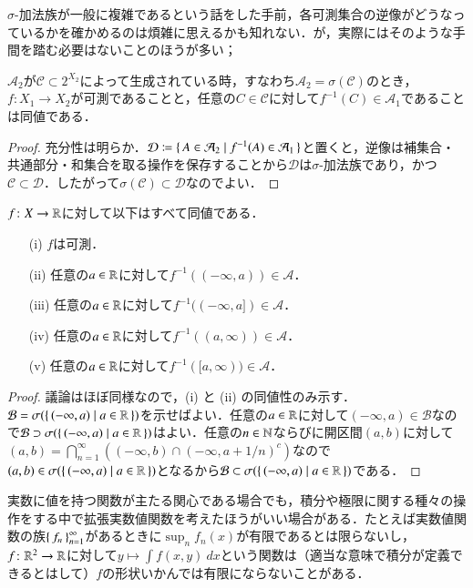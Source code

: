 $\sigma$-加法族が一般に複雑であるという話をした手前，各可測集合の逆像がどうなっているかを確かめるのは煩雑に思えるかも知れない．が，実際にはそのような手間を踏む必要はないことのほうが多い；

\begin{lem}
$\mathcal{A}_2$が$\mathcal{C} \subset 2^{X_2}$によって生成されている時，すなわち$\mathcal{A}_2 = \sigma(\mathcal{C})$のとき，$f \colon X_1 \to X_2$が可測であることと，任意の$C \in \mathcal{C}$に対して$f^{-1}(C) \in \mathcal{A}_1$であることは同値である．
\end{lem}

\begin{proof}
充分性は明らか．$\mathcal{D} \coloneqq \set{ A \in \mathcal{A}_2 | f^{-1}(A) \in \mathcal{A}_1}$と置くと，逆像は補集合・共通部分・和集合を取る操作を保存することから$\mathcal{D}$は$\sigma$-加法族であり，かつ$\mathcal{C} \subset \mathcal{D}$．したがって$\sigma(\mathcal{C}) \subset \mathcal{D}$なのでよい．
\end{proof}

\begin{lem}
$f \colon X \to \mathbb{R}$に対して以下はすべて同値である．
\begin{enumerate}
\item[(i)] $f$は可測．
\item[(ii)] 任意の$a \in \mathbb{R}$に対して$f^{-1}((-\infty,a)) \in \mathcal{A}$．
\item[(iii)] 任意の$a \in \mathbb{R}$に対して$f^{-1}((-\infty,a]) \in \mathcal{A}$．
\item[(iv)] 任意の$a \in \mathbb{R}$に対して$f^{-1}((a,\infty)) \in \mathcal{A}$．
\item[(v)] 任意の$a \in \mathbb{R}$に対して$f^{-1}([a,\infty)) \in \mathcal{A}$．
\end{enumerate}
\end{lem}

\begin{proof}
議論はほぼ同様なので，(i) と (ii) の同値性のみ示す．$\mathcal{B} = \sigma(\set{(-\infty,a) | a \in \mathbb{R}})$を示せばよい．任意の$a \in \mathbb{R}$に対して$(-\infty,a) \in \mathcal{B}$なので$\mathcal{B} \supset \sigma(\set{(-\infty,a) | a \in \mathbb{R}})$はよい．任意の$n \in \mathbb{N}$ならびに開区間$(a,b)$に対して$(a,b) = \bigcap_{n=1}^\infty \left( (-\infty,b) \cap (-\infty, a+1/n)^c \right)$なので$(a,b) \in \sigma(\set{(-\infty,a) | a \in \mathbb{R}})$となるから$\mathcal{B} \subset \sigma(\set{(-\infty,a) | a \in \mathbb{R}})$である．
\end{proof}

実数に値を持つ関数が主たる関心である場合でも，積分や極限に関する種々の操作をする中で拡張実数値関数を考えたほうがいい場合がある．たとえば実数値関数の族$\set{f_n}_{n=1}^\infty$があるときに$\sup_n f_n(x)$が有限であるとは限らないし，$f \colon \mathbb{R}^2 \to \mathbb{R}$に対して$y \mapsto \int f(x,y)\ dx$という関数は（適当な意味で積分が定義できるとはして）$f$の形状いかんでは有限にならないことがある．

